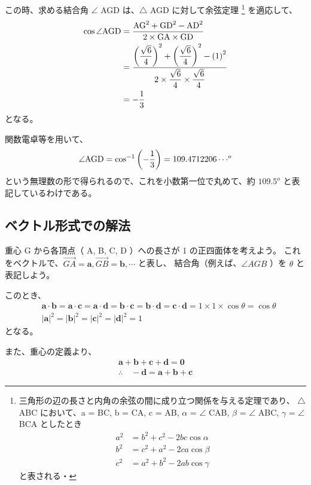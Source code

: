 \documentclass[uplatex,dvipdfmx,a4paper,11pt, titlepage]{jsarticle}
\begin{document}
\begin{appendix}
この時、求める結合角 $\angle$ AGD は、$\bigtriangleup$ AGD に対して余弦定理
\footnote
{
三角形の辺の長さと内角の余弦の間に成り立つ関係を与える定理であり、
$\bigtriangleup$ ABC において、a = BC, b = CA, c = AB, $\alpha$ = $\angle$ CAB, $\beta$ = $\angle$ ABC, $\gamma$ = $\angle$ BCA としたとき
\begin{align*}
a^2 &= b^2 + c^2 − 2 bc \cos \alpha \\
b^2 &= c^2 + a^2 − 2 ca \cos \beta \\
c^2 &= a^2 + b^2 − 2 ab \cos \gamma
\end{align*}
と表される・
}
を適応して、
\begin{align*}
\cos \angle {\rm AGD} 
	&= \dfrac{ {\rm AG}^2 + {\rm GD}^2 - {\rm AD}^2 }{ 2 \times {\rm GA} \times {\rm GD} } \\
	&= \dfrac{ \left( \dfrac{ \sqrt{6} }{ 4 } \right)^2 + \left( \dfrac{ \sqrt{6} }{ 4 } \right)^2 - \left( 1 \right)^2 }{ 2 \times \dfrac{ \sqrt{6} }{ 4 } \times \dfrac{ \sqrt{6} }{ 4 } } \\
	&= -\dfrac{ 1 }{ 3 }
\end{align*}
となる。

関数電卓等を用いて、
\begin{align*}
\angle {\rm AGD} = \cos ^{-1} \left( -\dfrac{1}{3} \right) = 109.4712206 \cdots^o
\end{align*}
という無理数の形で得られるので、これを小数第一位で丸めて、約 $109.5^o$ と表記しているわけである。

\subsection{ベクトル形式での解法}

重心 G から各頂点（ A, B, C, D ）への長さが 1 の正四面体を考えよう。
これをベクトルで、$\overrightarrow{GA} = {\bm a}, \overrightarrow{GB} = {\bm b}, \cdots$ と表し、
結合角（例えば、$\angle AGB$ ）を $\theta$ と表記しよう。

このとき、
\begin{align*}
&{\bm a} \cdot {\bm b} = {\bm a} \cdot {\bm c} = {\bm a} \cdot {\bm d} = {\bm b} \cdot {\bm c} = {\bm b} \cdot {\bm d} = {\bm c} \cdot {\bm d} = 1 \times 1 \times \cos \theta = \cos \theta \\
&|{\bm a}|^2 = |{\bm b}|^2 = |{\bm c}|^2 = |{\bm d}|^2 = 1
\end{align*}
となる。

また、重心の定義より、
\begin{align*}
{\bm a} + {\bm b} + {\bm c} + {\bm d} = {\bm 0} \\
\therefore \quad -{\bm d} ={\bm a} + {\bm b} + {\bm c}
\end{align*}


\end{appendix}
\end{document}

